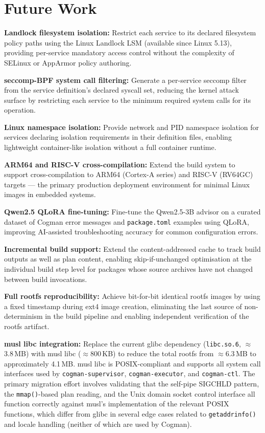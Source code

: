 \documentclass[12pt,a4paper]{report}
\begin{document}
\section{Future Work}

\textbf{Landlock filesystem isolation:}
Restrict each service to its declared filesystem policy paths using the Linux
Landlock LSM (available since Linux 5.13), providing per-service mandatory access
control without the complexity of SELinux or AppArmor policy authoring.

\textbf{seccomp-BPF system call filtering:}
Generate a per-service seccomp filter from the service definition's declared
syscall set, reducing the kernel attack surface by restricting each service to the
minimum required system calls for its operation.

\textbf{Linux namespace isolation:}
Provide network and PID namespace isolation for services declaring isolation
requirements in their definition files, enabling lightweight container-like
isolation without a full container runtime.

\textbf{ARM64 and RISC-V cross-compilation:}
Extend the build system to support cross-compilation to ARM64 (Cortex-A series)
and RISC-V (RV64GC) targets --- the primary production deployment environment for
minimal Linux images in embedded systems.

\textbf{Qwen2.5 QLoRA fine-tuning:}
Fine-tune the Qwen2.5-3B advisor on a curated dataset of Cogman error messages
and \texttt{package.toml} examples using QLoRA, improving AI-assisted
troubleshooting accuracy for common configuration errors.

\textbf{Incremental build support:}
Extend the content-addressed cache to track build outputs as well as plan content,
enabling skip-if-unchanged optimisation at the individual build step level for
packages whose source archives have not changed between build invocations.

\textbf{Full rootfs reproducibility:}
Achieve bit-for-bit identical rootfs images by using a fixed timestamp during
ext4 image creation, eliminating the last source of non-determinism in the build
pipeline and enabling independent verification of the rootfs artifact.

\textbf{musl libc integration:}
Replace the current glibc dependency (\texttt{libc.so.6}, $\approx$3.8\,MB) with
musl libc ($\approx$800\,KB) to reduce the total rootfs from $\approx$6.3\,MB to
approximately 4.1\,MB. musl libc is POSIX-compliant and supports all system call
interfaces used by \texttt{cogman-supervisor}, \texttt{cogman-executor}, and
\texttt{cogman-ctl}. The primary migration effort involves validating that the
self-pipe SIGCHLD pattern, the \texttt{mmap()}-based plan reading, and the Unix
domain socket control interface all function correctly against musl's implementation
of the relevant POSIX functions, which differ from glibc in several edge cases
related to \texttt{getaddrinfo()} and locale handling (neither of which are used
by Cogman).
\end{document}
